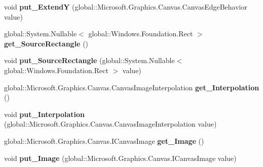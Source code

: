 \begin{DoxyCompactItemize}
void {\bfseries put\+\_\+\+ExtendY} (global\+::\+Microsoft.\+Graphics.\+Canvas.\+Canvas\+Edge\+Behavior value)
\item 
\mbox{\label{interface_microsoft_1_1_graphics_1_1_canvas_1_1_brushes_1_1_i_canvas_image_brush_abd99fb761de06f6a5a4446147e3b0dee}} 
global\+::\+System.\+Nullable$<$ global\+::\+Windows.\+Foundation.\+Rect $>$ {\bfseries get\+\_\+\+Source\+Rectangle} ()
\item 
\mbox{\label{interface_microsoft_1_1_graphics_1_1_canvas_1_1_brushes_1_1_i_canvas_image_brush_a18db26edd67cb06b7b78f0e7709c8806}} 
void {\bfseries put\+\_\+\+Source\+Rectangle} (global\+::\+System.\+Nullable$<$ global\+::\+Windows.\+Foundation.\+Rect $>$ value)
\item 
\mbox{\label{interface_microsoft_1_1_graphics_1_1_canvas_1_1_brushes_1_1_i_canvas_image_brush_aebd2633bbc018c5fc49fd70e6a24fed8}} 
global\+::\+Microsoft.\+Graphics.\+Canvas.\+Canvas\+Image\+Interpolation {\bfseries get\+\_\+\+Interpolation} ()
\item 
\mbox{\label{interface_microsoft_1_1_graphics_1_1_canvas_1_1_brushes_1_1_i_canvas_image_brush_a149e4d24e65f75b3f58f3a71d893bcd4}} 
void {\bfseries put\+\_\+\+Interpolation} (global\+::\+Microsoft.\+Graphics.\+Canvas.\+Canvas\+Image\+Interpolation value)
\item 
\mbox{\label{interface_microsoft_1_1_graphics_1_1_canvas_1_1_brushes_1_1_i_canvas_image_brush_a0a2e397b21701c2009442817061aea19}} 
global\+::\+Microsoft.\+Graphics.\+Canvas.\+I\+Canvas\+Image {\bfseries get\+\_\+\+Image} ()
\item 
\mbox{\label{interface_microsoft_1_1_graphics_1_1_canvas_1_1_brushes_1_1_i_canvas_image_brush_adce6e5d6d2750a7392b5352faf3f5f4d}} 
void {\bfseries put\+\_\+\+Image} (global\+::\+Microsoft.\+Graphics.\+Canvas.\+I\+Canvas\+Image value)

\end{DoxyCompactItemize}

